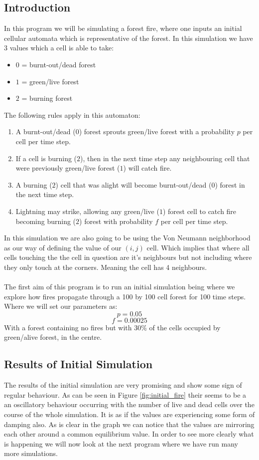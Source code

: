 \documentclass{article}
\begin{document}
\subsection{Introduction}
In this program we will be simulating a forest fire, where one inputs an initial cellular automata which is representative of the forest. In this simulation we have 3 values which a cell is able to take:
\begin{itemize}
  \item $0$ = burnt-out/dead forest
  \item $1$ = green/live forest
  \item $2$ = burning forest
\end{itemize}
The following rules apply in this automaton:
\begin{enumerate}
    \item A burnt-out/dead ($0$) forest sprouts green/live forest with a probability $p$ per cell per time step.
    \item If a cell is burning ($2$), then in the next time step any neighbouring cell that were previously green/live forest ($1$) will catch fire.
    \item A burning ($2$) cell that was alight will become burnt-out/dead ($0$) forest in the next time step.
    \item Lightning may strike, allowing any green/live ($1$) forest cell to catch fire becoming burning ($2$) forest with probability $f$ per cell per time step.
\end{enumerate}{}
In this simulation we are also going to be using the Von Neumann neighborhood as our way of defining the value of our $(i, j)$ cell. Which implies that where all cells touching the the cell in question are it's neighbours but not including where they only touch at the corners. Meaning the cell has 4 neighbours.\\
\\
The first aim of this program is to run an initial simulation being where we explore how fires propagate through a 100 by 100 cell forest for 100 time steps. Where we will set our parameters as:
$$
p = 0.05
$$
$$
f = 0.00025
$$
With a forest containing no fires but with 30\% of the cells occupied by green/alive forest, in the centre.

\subsection{Results of Initial Simulation}
The results of the initial simulation are very promising and show some sign of regular behaviour. As can be seen in Figure \ref{fig:initial_fire} their seems to be a an oscillatory behaviour occurring with the number of live and dead cells over the course of the whole simulation. It is as if the values are experiencing some form of damping also. As is clear in the graph we can notice that the values are mirroring each other around a common equilibrium value. In order to see more clearly what is happening we will now look at the next program where we have run many more simulations.
\end{document}
